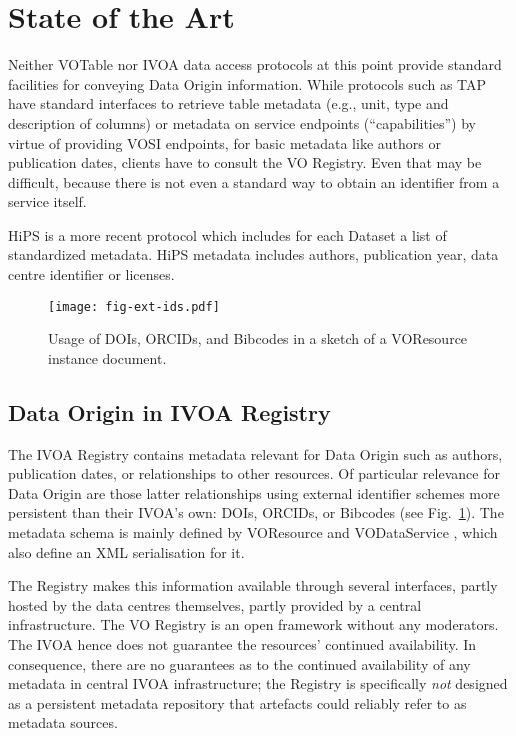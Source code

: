 \documentclass[11pt,a4paper]{ivoa}
\begin{document}
\section{State of the Art}

Neither VOTable \citep{2019ivoa.spec.1021O} nor IVOA data access protocols at this point provide standard facilities for conveying Data Origin information. While protocols such as TAP \citep{2019ivoa.spec.0927D} have standard interfaces to retrieve table metadata (e.g., unit, type and description of columns) or metadata on service endpoints (``capabilities'') by virtue of providing VOSI \citep{2017ivoa.spec.0524G} endpoints, for basic metadata like authors or publication dates,  clients have to consult the VO Registry.  Even that may be difficult, because there is not even a standard way to obtain an identifier from a service itself.

HiPS \citep{2017ivoa.spec.0519F} is a more recent protocol which includes for each Dataset a list of standardized metadata. HiPS metadata includes authors, publication year, data centre identifier or licenses.

\begin{figure}
\centering
\texttt{[image: fig-ext-ids.pdf]}
\caption{Usage of DOIs, ORCIDs, and Bibcodes in a sketch of a
VOResource instance document.}
\label{fig:extids}
\end{figure}

\subsection{Data Origin in IVOA Registry}
The IVOA Registry contains metadata relevant for Data Origin such as authors,
publication dates,
or relationships to other resources.  Of particular relevance for Data
Origin are those latter relationships using external identifier schemes
more persistent than their IVOA's own: DOIs, ORCIDs, or Bibcodes (see
Fig.~\ref{fig:extids}).  The  metadata schema is mainly defined by
VOResource \citep{2018ivoa.spec.0625P} and VODataService
\citep{2021ivoa.spec.1102D}, which also define an XML serialisation for it.

The Registry makes this information available through several interfaces, partly
hosted by the data centres themselves, partly provided by a central
infrastructure.
The VO Registry is an open framework without any moderators.
The IVOA hence does not guarantee the resources' continued availability.
In consequence, there are no guarantees as to the continued availability
of any metadata in central IVOA infrastructure; the Registry is
specifically \emph{not} designed as a persistent metadata repository
that artefacts could reliably refer to as metadata sources.
\end{document}
